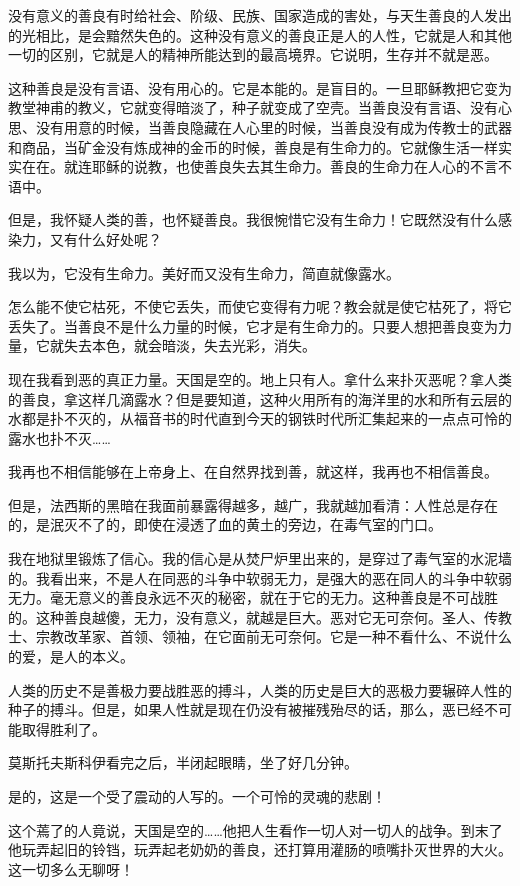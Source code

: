没有意义的善良有时给社会、阶级、民族、国家造成的害处，与天生善良的人发出的光相比，是会黯然失色的。这种没有意义的善良正是人的人性，它就是人和其他一切的区别，它就是人的精神所能达到的最高境界。它说明，生存并不就是恶。

这种善良是没有言语、没有用心的。它是本能的。是盲目的。一旦耶稣教把它变为教堂神甫的教义，它就变得暗淡了，种子就变成了空壳。当善良没有言语、没有心思、没有用意的时候，当善良隐藏在人心里的时候，当善良没有成为传教士的武器和商品，当矿金没有炼成神的金币的时候，善良是有生命力的。它就像生活一样实实在在。就连耶稣的说教，也使善良失去其生命力。善良的生命力在人心的不言不语中。

但是，我怀疑人类的善，也怀疑善良。我很惋惜它没有生命力！它既然没有什么感染力，又有什么好处呢？

我以为，它没有生命力。美好而又没有生命力，简直就像露水。

怎么能不使它枯死，不使它丢失，而使它变得有力呢？教会就是使它枯死了，将它丢失了。当善良不是什么力量的时候，它才是有生命力的。只要人想把善良变为力量，它就失去本色，就会暗淡，失去光彩，消失。

现在我看到恶的真正力量。天国是空的。地上只有人。拿什么来扑灭恶呢？拿人类的善良，拿这样几滴露水？但是要知道，这种火用所有的海洋里的水和所有云层的水都是扑不灭的，从福音书的时代直到今天的钢铁时代所汇集起来的一点点可怜的露水也扑不灭……

我再也不相信能够在上帝身上、在自然界找到善，就这样，我再也不相信善良。

但是，法西斯的黑暗在我面前暴露得越多，越广，我就越加看清：人性总是存在的，是泯灭不了的，即使在浸透了血的黄土的旁边，在毒气室的门口。

我在地狱里锻炼了信心。我的信心是从焚尸炉里出来的，是穿过了毒气室的水泥墙的。我看出来，不是人在同恶的斗争中软弱无力，是强大的恶在同人的斗争中软弱无力。毫无意义的善良永远不灭的秘密，就在于它的无力。这种善良是不可战胜的。这种善良越傻，无力，没有意义，就越是巨大。恶对它无可奈何。圣人、传教士、宗教改革家、首领、领袖，在它面前无可奈何。它是一种不看什么、不说什么的爱，是人的本义。

人类的历史不是善极力要战胜恶的搏斗，人类的历史是巨大的恶极力要辗碎人性的种子的搏斗。但是，如果人性就是现在仍没有被摧残殆尽的话，那么，恶已经不可能取得胜利了。

莫斯托夫斯科伊看完之后，半闭起眼睛，坐了好几分钟。

是的，这是一个受了震动的人写的。一个可怜的灵魂的悲剧！

这个蔫了的人竟说，天国是空的……他把人生看作一切人对一切人的战争。到末了他玩弄起旧的铃铛，玩弄起老奶奶的善良，还打算用灌肠的喷嘴扑灭世界的大火。这一切多么无聊呀！

